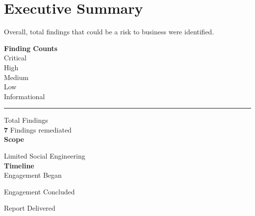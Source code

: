 \section{Executive Summary}

\noindent
\begin{minipage}[t]{0.70\textwidth}
    

    Overall,  total findings that could be a risk to \clientP business were identified. 
    
\end{minipage}
\hfill %
\begin{minipage}[t]{0.25\textwidth}
    \textbf{Finding Counts}\\
    \small
    { \textbf{} Critical}\\
    { \textbf{} High}\\
    { \textbf{} Medium}\\
    { \textbf{} Low}\\
    { \textbf{} Informational}\\
    \rule{0.6\linewidth}{0.4pt}
    
    \textbf{} Total Findings\\

    \textbf{7} Findings remediated\\

    \normalsize
    \textbf{Scope}\\
    \small
    

    Limited Social Engineering\\

    \normalsize
    \textbf{Timeline}\\
    \small
    Engagement Began\\
    \texttt{\engagementStartTime}

    \medskip

    Engagement Concluded\\
    \texttt{\engagementEndTime}

    \medskip

    Report Delivered\\
    \texttt{\reportTime}
\end{minipage}

\vspace{2.5cm}



\newpage
